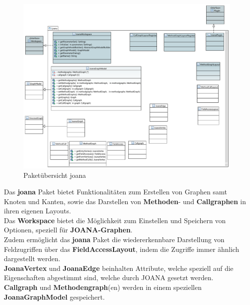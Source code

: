 \begin{figure}[hb]
  \centering
  \includegraphics[width=380pt]{resourcen/joana.pdf}
  \caption{Paketübersicht joana}
  \label{fig:packge_joana}
\end{figure}


Das \textbf{joana} Paket bietet Funktionalitäten zum Erstellen von Graphen samt Knoten und Kanten, sowie das Darstellen von \textbf{Methoden}- und \textbf{Callgraphen} in ihren eigenen Layouts.\\
Das \textbf{Workspace} bietet die Möglichkeit zum Einstellen und Speichern von Optionen, speziell für \textbf{JOANA-Graphen}.\\
Zudem ermöglicht das \textbf{joana} Paket die wiedererkennbare Darstellung von Feldzugriffen über das \textbf{FieldAccessLayout}, indem die Zugriffe immer ähnlich dargestellt werden.\\
\textbf{JoanaVertex} und \textbf{JoanaEdge} beinhalten Attribute, welche speziell auf die Eigenschaften abgestimmt sind, welche durch JOANA gesetzt werden.\\
\textbf{Callgraph} und \textbf{Methodengraph}(en) werden in einem speziellen \textbf{JoanaGraphModel} gespeichert.